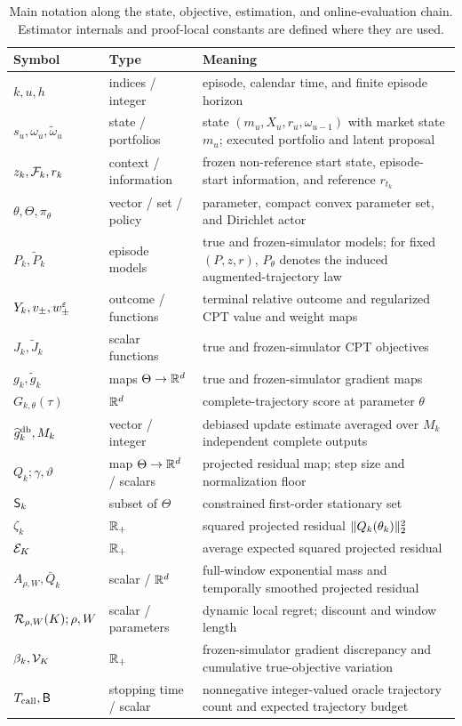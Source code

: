 \begin{table}[H]
\centering
\caption{Main notation along the state, objective, estimation, and online-evaluation chain.  Estimator internals and proof-local constants are defined where they are used.}
\label{tab:notation-core}
\small
\begin{tabularx}{\textwidth}{@{}p{}p{}X@{}}
\toprule
Symbol & Type & Meaning \\
\midrule
$k,u,h$ & indices / integer & episode, calendar time, and finite episode horizon \\
$s_u,\omega_u,\widetilde\omega_u$ & state / portfolios & state $(m_u,X_u,r_u,\omega_{u-1})$ with market state $m_u$; executed portfolio and latent proposal \\
$z_k,\mathcal F_k,r_k$ & context / information & frozen non-reference start state, episode-start information, and reference $r_{t_k}$ \\
$\theta,\Theta,\pi_\theta$ & vector / set / policy & parameter, compact convex parameter set, and Dirichlet actor \\
$P_k,\widetilde P_k$ & episode models & true and frozen-simulator models; for fixed $(P,z,r)$, $P_\theta$ denotes the induced augmented-trajectory law \\
$Y_k,v_\pm,w_\pm^\varepsilon$ & outcome / functions & terminal relative outcome and regularized CPT value and weight maps \\
$J_k,\widetilde J_k$ & scalar functions & true and frozen-simulator CPT objectives \\
$g_k,\widetilde g_k$ & maps $\Theta\to\mathbb R^d$ & true and frozen-simulator gradient maps \\
$G_{k,\theta}(\tau)$ & $\mathbb R^d$ & complete-trajectory score at parameter $\theta$ \\
$\widehat g_k^{\mathrm{db}},M_k$ & vector / integer & debiased update estimate averaged over $M_k$ independent complete outputs \\
$Q_k;\gamma,\vartheta$ & map $\Theta\to\mathbb R^d$ / scalars & projected residual map; step size and normalization floor \\
$\mathsf S_k$ & subset of $\Theta$ & constrained first-order stationary set \\
$\zeta_k$ & $\mathbb R_+$ & squared projected residual $\lVert Q_k(\theta_k)\rVert_2^2$ \\
$\mathcal E_K$ & $\mathbb R_+$ & average expected squared projected residual \\
$A_{\rho,W},\bar Q_k$ & scalar / $\mathbb R^d$ & full-window exponential mass and temporally smoothed projected residual \\
$\mathcal R_{\rho,W}(K);\rho,W$ & scalar / parameters & dynamic local regret; discount and window length \\
$\beta_k,\mathcal V_K$ & $\mathbb R_+$ & frozen-simulator gradient discrepancy and cumulative true-objective variation \\
$T_{\rm call},\mathsf B$ & stopping time / scalar & nonnegative integer-valued oracle trajectory count and expected trajectory budget \\
\bottomrule
\end{tabularx}
\end{table}

